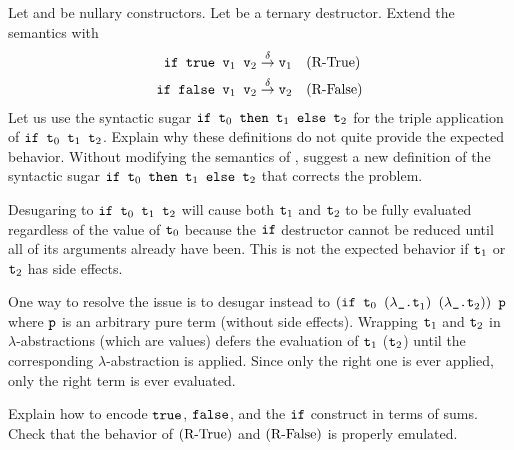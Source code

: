 \documentclass{amsart}
\begin{document}
\begin{problem}[10.1.6]
  Let  and  be nullary constructors. Let  be a
  ternary destructor. Extend the semantics with
  \begin{align*}
    \texttt{if true v}_1 \texttt{ v}_2 &\overset{\delta}{\to} \texttt{v}_1 &
        &\textup{(R-True)} \\
    \texttt{if false v}_1 \texttt{ v}_2 &\overset{\delta}{\to} \texttt{v}_2 &
        &\textup{(R-False)}
  \end{align*}
  Let us use the syntactic sugar \(\texttt{if t}_0 \texttt{ then t}_1
  \texttt{ else t}_2\) for the triple application of \(\texttt{if t}_0 \texttt{ t}_1
  \texttt{ t}_2\). Explain why these definitions do not quite provide the expected
  behavior. Without modifying the semantics of , suggest a new
  definition of the syntactic sugar \(\texttt{if t}_0 \texttt{ then t}_1
  \texttt{ else t}_2\) that corrects the problem.
\end{problem}

\begin{solution}
  Desugaring to \(\texttt{if t}_0 \texttt{ t}_1 \texttt{ t}_2\) will cause
  both \(\texttt{t}_1\) and \(\texttt{t}_2\) to be fully evaluated regardless of the
  value of \(\texttt{t}_0\) because the \(\texttt{if}\) destructor cannot be reduced
  until all of its arguments already have been. This is not the expected
  behavior if \(\texttt{t}_1\) or \(\texttt{t}_2\) has side effects.

  One way to resolve the issue is to desugar instead to \((\texttt{if t}_0
  \texttt{ } (\lambda \texttt{\_.t}_1) \texttt{ } (\lambda \texttt{\_.t}_2))
  \texttt{ p}\) where \(\texttt{p}\) is an arbitrary pure term (without side
  effects).  Wrapping \(\texttt{t}_1\) and \(\texttt{t}_2\) in
  \(\lambda\)-abstractions (which are values) defers the evaluation
  of \(\texttt{t}_1\) (\(\texttt{t}_2\)) until the corresponding
  \(\lambda\)-abstraction is applied. Since only the right one is ever applied,
  only the right term is ever evaluated.
\end{solution}

\begin{problem}[10.1.8]
  Explain how to encode \(\texttt{true}\), \(\texttt{false}\), and the \(\texttt{if}\)
  construct in terms of sums. Check that the behavior of \(\textup{(R-True)}\)
  and \(\textup{(R-False)}\) is properly emulated.
\end{problem}
\end{document}
